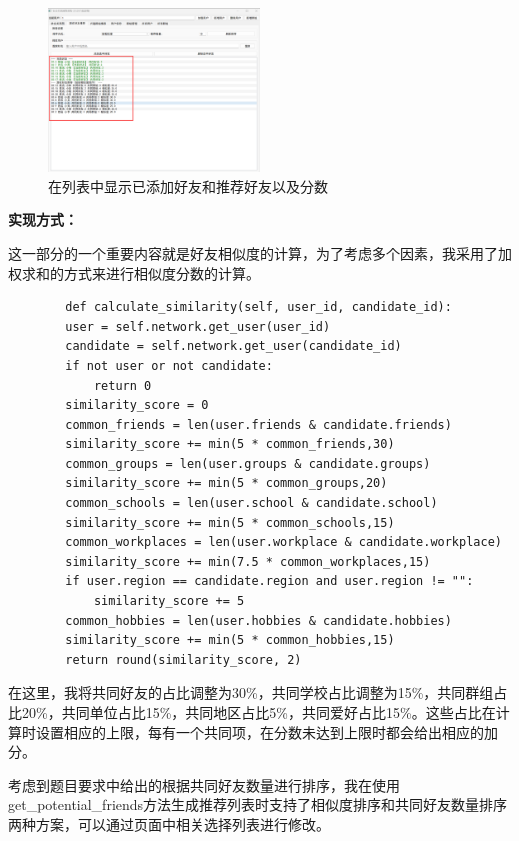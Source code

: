 \documentclass[12pt,a4paper]{article}
\begin{document}
\begin{figure}[H]
    \centering
    \includegraphics[width=0.5\textwidth]{pt2-3.png}
    \caption{在列表中显示已添加好友和推荐好友以及分数}
\end{figure}

\noindent\textbf{实现方式：}

这一部分的一个重要内容就是好友相似度的计算，为了考虑多个因素，我采用了加权求和的方式来进行相似度分数的计算。

\begin{verbatim}
        def calculate_similarity(self, user_id, candidate_id):
        user = self.network.get_user(user_id)
        candidate = self.network.get_user(candidate_id)
        if not user or not candidate:
            return 0
        similarity_score = 0
        common_friends = len(user.friends & candidate.friends)
        similarity_score += min(5 * common_friends,30)
        common_groups = len(user.groups & candidate.groups)
        similarity_score += min(5 * common_groups,20)
        common_schools = len(user.school & candidate.school)
        similarity_score += min(5 * common_schools,15)
        common_workplaces = len(user.workplace & candidate.workplace)
        similarity_score += min(7.5 * common_workplaces,15)
        if user.region == candidate.region and user.region != "":
            similarity_score += 5
        common_hobbies = len(user.hobbies & candidate.hobbies)
        similarity_score += min(5 * common_hobbies,15)
        return round(similarity_score, 2)
\end{verbatim}

在这里，我将共同好友的占比调整为30\%，共同学校占比调整为15\%，共同群组占比20\%，共同单位占比15\%，共同地区占比5\%，共同爱好占比15\%。这些占比在计算时设置相应的上限，每有一个共同项，在分数未达到上限时都会给出相应的加分。

考虑到题目要求中给出的根据共同好友数量进行排序，我在使用get\_potential\_friends方法生成推荐列表时支持了相似度排序和共同好友数量排序两种方案，可以通过页面中相关选择列表进行修改。
\end{document}
